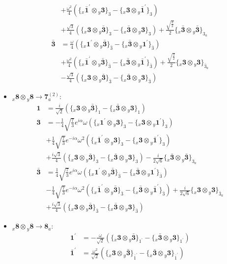 \documentclass[english]{article}
\newcommand{\rep}[1]{\mathbf{#1}}
\newcommand{\repx}[2]{{}_{#2}\mathbf{#1}}
\newcommand{\tsprodx}[2]{\repx{#1}{x}\otimes\repx{#2}{y}}
\newcommand{\subcgt}[3]{\big\{ \tsprodx{#1}{#2}\big\}^{}_{#3}}
\begin{document}
\begin{itemize}
\begin{align*}
 & +\frac{\omega ^2}{4}\left(\subcgt{\bar{1}^{\prime}}{3}{3}-\subcgt{3}{\bar{1}^{\prime}}{3}\right) \\ 
 & +\frac{\sqrt{3}}{4}\left(\subcgt{3}{\bar{3}}{3}-\subcgt{\bar{3}}{3}{3}\right)+\frac{\sqrt{\frac{3}{2}}}{2}\subcgt{\bar{3}}{\bar{3}}{3_{a}}
\\
\rep{\bar{3}} & = \frac{\omega }{4}\left(\subcgt{1^{\prime}}{\bar{3}}{\bar{3}}-\subcgt{\bar{3}}{1^{\prime}}{\bar{3}}\right) \\ 
 & +\frac{\omega ^2}{4}\left(\subcgt{\bar{1}^{\prime}}{\bar{3}}{\bar{3}}-\subcgt{\bar{3}}{\bar{1}^{\prime}}{\bar{3}}\right)+\frac{\sqrt{\frac{3}{2}}}{2}\subcgt{3}{3}{\bar{3}_{a}} \\ 
 & -\frac{\sqrt{3}}{4}\left(\subcgt{3}{\bar{3}}{\bar{3}}-\subcgt{\bar{3}}{3}{\bar{3}}\right)
\end{align*}
\item $\tsprodx{8}{8}\to\rep{7}_{a}^{(2)}$:
\begin{align*}
\rep{1} & = \frac{i}{\sqrt{2}}\left(\subcgt{3}{\bar{3}}{1}-\subcgt{\bar{3}}{3}{1}\right)
\\
\rep{3} & = -\frac{1}{4} \sqrt{\frac{7}{3}} e^{i \alpha } \omega\left(\subcgt{1^{\prime}}{3}{3}-\subcgt{3}{1^{\prime}}{3}\right) \\ 
 & +\frac{1}{4} \sqrt{\frac{7}{3}} e^{-i \alpha } \omega ^2\left(\subcgt{\bar{1}^{\prime}}{3}{3}-\subcgt{3}{\bar{1}^{\prime}}{3}\right) \\ 
 & +\frac{i \sqrt{3}}{4}\left(\subcgt{3}{\bar{3}}{3}-\subcgt{\bar{3}}{3}{3}\right)-\frac{i}{2 \sqrt{6}}\subcgt{\bar{3}}{\bar{3}}{3_{a}}
\\
\rep{\bar{3}} & = \frac{1}{4} \sqrt{\frac{7}{3}} e^{i \alpha } \omega\left(\subcgt{1^{\prime}}{\bar{3}}{\bar{3}}-\subcgt{\bar{3}}{1^{\prime}}{\bar{3}}\right) \\ 
 & -\frac{1}{4} \sqrt{\frac{7}{3}} e^{-i \alpha } \omega ^2\left(\subcgt{\bar{1}^{\prime}}{\bar{3}}{\bar{3}}-\subcgt{\bar{3}}{\bar{1}^{\prime}}{\bar{3}}\right)+\frac{i}{2 \sqrt{6}}\subcgt{3}{3}{\bar{3}_{a}} \\ 
 & +\frac{i \sqrt{3}}{4}\left(\subcgt{3}{\bar{3}}{\bar{3}}-\subcgt{\bar{3}}{3}{\bar{3}}\right)
\end{align*}
\item $\tsprodx{8}{8}\to\rep{8}_{a}$:
\begin{align*}
\rep{1^{\prime}} & = -\frac{\omega }{\sqrt{2}}\left(\subcgt{3}{\bar{3}}{1^{\prime}}-\subcgt{\bar{3}}{3}{1^{\prime}}\right)
\\
\rep{\bar{1}^{\prime}} & = \frac{\omega ^2}{\sqrt{2}}\left(\subcgt{3}{\bar{3}}{\bar{1}^{\prime}}-\subcgt{\bar{3}}{3}{\bar{1}^{\prime}}\right)

\end{align*}
\end{itemize}
\end{document}
